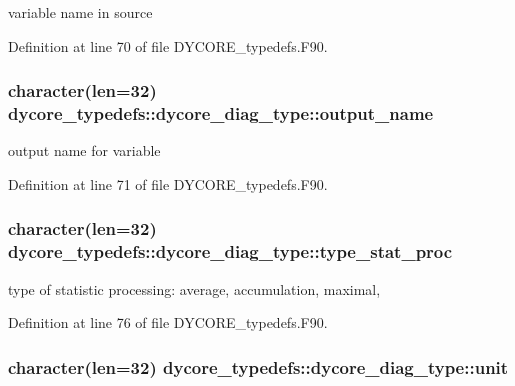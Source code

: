variable name in source 



Definition at line 70 of file D\-Y\-C\-O\-R\-E\-\_\-typedefs.\-F90.

\subsubsection[{output\-\_\-name}]{\setlength{\rightskip}{0pt plus 5cm}character(len=32) dycore\-\_\-typedefs\-::dycore\-\_\-diag\-\_\-type\-::output\-\_\-name}\label{structdycore__typedefs_1_1dycore__diag__type_a06218b1408fa9b6730e1034b6d26c77c}


output name for variable 



Definition at line 71 of file D\-Y\-C\-O\-R\-E\-\_\-typedefs.\-F90.

\subsubsection[{type\-\_\-stat\-\_\-proc}]{\setlength{\rightskip}{0pt plus 5cm}character(len=32) dycore\-\_\-typedefs\-::dycore\-\_\-diag\-\_\-type\-::type\-\_\-stat\-\_\-proc}\label{structdycore__typedefs_1_1dycore__diag__type_ab80143ebc2497201057b46c075d3bf68}


type of statistic processing\-: average, accumulation, maximal, 



Definition at line 76 of file D\-Y\-C\-O\-R\-E\-\_\-typedefs.\-F90.

\subsubsection[{unit}]{\setlength{\rightskip}{0pt plus 5cm}character(len=32) dycore\-\_\-typedefs\-::dycore\-\_\-diag\-\_\-type\-::unit}\label{structdycore__typedefs_1_1dycore__diag__type_ac3db7b34f757a51cd2f00f6d0d68539f}


